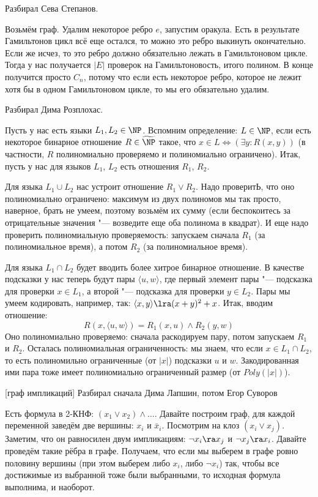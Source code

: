 	Разбирал Сева Степанов.

	Возьмём граф.
	Удалим некоторое ребро $e$, запустим оракула.
	Есть в результате Гамильтонов цикл всё еще остался, то можно это ребро выкинуть окончательно.
	Если же исчез, то это ребро должно обязательно лежать в Гамильтоновом цикле.
	Тогда у нас получается $|E|$ проверок на Гамильтоновость, итого полином.
	В конце получится просто $C_n$, потому что если есть некоторое ребро, которое не лежит хотя
	бы в одном Гамильтоновом цикле, то мы его обязательно удалим.

	Разбирал Дима Розплохас.

	Пусть у нас есть языки $L_1, L_2 \in \NP$.
	Вспомним определение: $L \in \NP$, если есть некоторое бинарное отношение $R \in \widetilde{\NP}$
	такое, что $x \in L \iff (\exists y \colon R(x, y))$ (в частности, $R$ полиномиально проверяемо
	и полиномиально ограничено).
	Итак, пусть у нас для языков $L_1$, $L_2$ есть отношения $R_1$, $R_2$.

	Для языка $L_1 \cup L_2$ нас устроит отношение $R_1 \lor R_2$.
	Надо проверитЬ, что оно полиномиально ограничено: максимум из двух полиномов мы так просто, наверное, брать не умеем,
	поэтому возьмём их сумму (если беспокоитесь за отрицательные значения "--- возведите еще оба полинома в квадрат).
	И еще надо проверить полиномиальную проверяемость: запускаем сначала $R_1$ (за полиномиальное время),
	а потом $R_2$ (за полиномиальное время).

	Для языка $L_1 \cap L_2$ будет вводить более хитрое бинарное отношение.
	В качестве подсказки у нас теперь будут пары $\langle u, w \rangle$,
	где первый элемент пары "--- подсказка для проверки $x \in L_1$,
	а второй "--- подсказка для проверки $y \in L_2$.
	Пары мы умеем кодировать, например, так: $\langle x, y \rangle \lra (x+y)^2+x$.
	Итак, вводим отношение:
	\[ R(x, \langle u, w \rangle) = R_1(x, u) \land R_2(y, w) \]
	Оно полиномиально проверяемо: сначала раскодируем пару, потом запускаем $R_1$ и $R_2$.
	Осталась полиномиальная ограниченность: мы знаем, что если $x \in L_1 \cap L_2$,
	то есть полиномильно ограниченные (от $|x|$) подсказки $u$ и $w$.
	Закодированная ими пара тоже имеет полиномиально ограниченный размер (от $Poly(|x|)$).

[граф импликаций]
	Разбирал сначала Дима Лапшин, потом Егор Суворов

	Есть формула в 2-КНФ: $(x_1 \lor x_2) \land \dots$.
	Давайте построим граф, для каждой переменной заведём две вершины: $x_i$ и $\bar x_i$.
	Посмотрим на клоз $(x_i \lor x_j)$.
	Заметим, что он равносилен двум импликациям: $\lnot x_i \ra x_j$ и $\lnot x_j \ra x_i$.
	Давайте проведём такие рёбра в графе.
	Получаем, что если мы выберем в графе ровно половину вершины (при этом выберем либо $x_i$,
	либо $\lnot x_i$) так, чтобы все достижимые из выбранной тоже были выбранными, то исходная формула выполнима,
	и наоборот.
	
